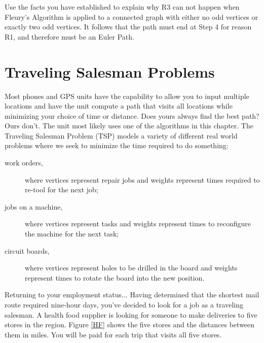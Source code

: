 \begin{prb}
Use the facts you have established to explain why R3 can not happen when Fleury's Algorithm is applied to a connected graph with either no odd vertices or exactly two odd vertices.  It follows that the path must end at Step 4 for reason R1, and therefore must be an Euler Path.
\end{prb}


\chapter{Traveling Salesman Problems}

Most phones and GPS units have the capability to allow you to input multiple locations and have the unit compute a path that visits all locations while minimizing your choice of time or distance.   Does yours always find the best path?  Ours don't.  The unit most likely uses one of the algorithms in this chapter.   The Traveling Salesman Problem (TSP) models a variety of different real world problems where we seek to minimize the time required to do something:

\begin{description}
  \item[work orders,] where vertices represent repair jobs and weights
represent times required to re-tool for the next job;
  \item[jobs on a machine,] where vertices represent tasks and weights
represent times to reconfigure the machine for the next task;
  \item[circuit boards,] where vertices represent holes to be drilled in
the board and weights represent times to rotate the board into the
new position.
\end{description}


Returning to your employment status... Having determined that the shortest mail route required nine-hour days, you've decided to look for a job as a traveling salesman.  A health food supplier is looking for someone to make deliveries to five stores in the region.  Figure \ref{HF} shows the five stores and the distances between them in miles.  You will be paid for each trip that visits all five stores.

